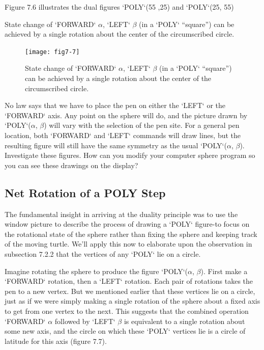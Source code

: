 \documentclass{book}
\begin{document}
Figure 7.6 illustrates the dual figures \textsc{`POLY`}(55 ,25) and \textsc{`POLY`}(25, 55)

State change of \textsc{`FORWARD`} $\alpha$, \textsc{`LEFT`} $\beta$ (in a \textsc{`POLY`} ``square'') can be achieved by a single
rotation about the center of the circumscribed circle.

\begin{figure}
\begin{center}
\texttt{[image: fig7-7]}
\caption{State change of \textsc{`FORWARD`} $\alpha$, \textsc{`LEFT`} $\beta$ (in a \textsc{`POLY`} ``square'') can be achieved by a single rotation about the center of the circumscribed circle.}
\end{center}
\end{figure}

No law says that we have to place the pen on either the \textsc{`LEFT`} or
the \textsc{`FORWARD`} axis. Any point on the sphere will do, and the picture
drawn by \textsc{`POLY`}($\alpha$, $\beta$) will vary with the selection of the pen site. For
a general pen location, both \textsc{`FORWARD`} and \textsc{`LEFT`} commands will draw
lines, but the resulting figure will still have the same symmetry as the
usual \textsc{`POLY`}($\alpha$, $\beta$). Investigate these figures. How can you modify your
computer sphere program so you can see these drawings on the display?

\subsection{Net Rotation of a POLY Step}

The fundamental insight in arriving at the duality principle was to use
the window picture to describe the process of drawing a \textsc{`POLY`} figure-to
focus on the rotational state of the sphere rather than fixing the sphere
and keeping track of the moving turtle. We'll apply this now to elaborate
upon the observation in subsection 7.2.2 that the vertices of any \textsc{`POLY`}
lie on a circle.

Imagine rotating the sphere to produce the figure \textsc{`POLY`}($\alpha$, $\beta$). First
make a \textsc{`FORWARD`} rotation, then a \textsc{`LEFT`} rotation. Each pair of rotations
takes the pen to a new vertex. But we mentioned earlier that these
vertices lie on a circle, just as if we were simply making a single rotation
of the sphere about a fixed axis to get from one vertex to the next. This
suggests that the combined operation \textsc{`FORWARD`} $\alpha$ followed by \textsc{`LEFT`} $\beta$ is
equivalent to a single rotation about some new axis, and the circle on
which these \textsc{`POLY`} vertices lie is a circle of latitude for this axis (figure
7.7).
\end{document}
